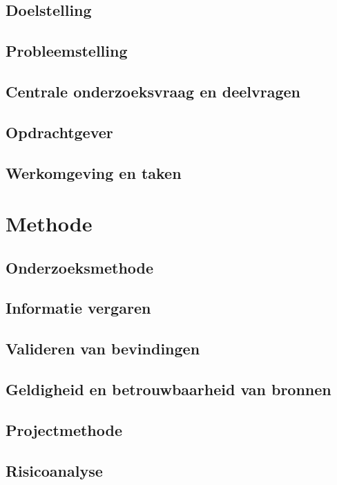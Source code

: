 \documentclass{report}
\begin{document}
\section{Doelstelling}

\section{Probleemstelling}

\section{Centrale onderzoeksvraag en deelvragen}

\section{Opdrachtgever}

\section{Werkomgeving en taken}


\chapter{Methode}

\section{Onderzoeksmethode}

\section{Informatie vergaren}

\section{Valideren van bevindingen}

\section{Geldigheid en betrouwbaarheid van bronnen}

\section{Projectmethode}

\section{Risicoanalyse}
\end{document}
